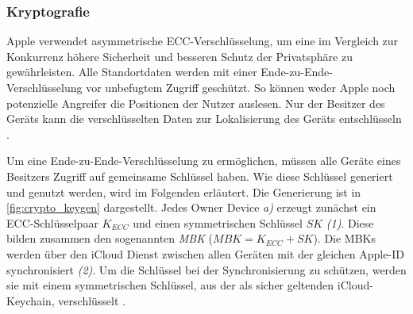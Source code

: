 \subsubsection{Kryptografie}
\label{sec:Kryptografie}
Apple verwendet asymmetrische \ac{ECC}-Verschlüsselung, um eine im Vergleich zur Konkurrenz höhere Sicherheit und besseren Schutz der Privatsphäre zu gewährleisten.
Alle Standortdaten werden mit einer Ende-zu-Ende-Verschlüsselung vor unbefugtem Zugriff geschützt.
So können weder Apple noch potenzielle Angreifer die Positionen der Nutzer auslesen.
Nur der Besitzer des Geräts kann die verschlüsselten Daten zur Lokalisierung des Geräts entschlüsseln \cite{Greenberg_FindMyCrypto}.

Um eine Ende-zu-Ende-Verschlüsselung zu ermöglichen, müssen alle Geräte eines Besitzers Zugriff auf gemeinsame Schlüssel haben.
Wie diese Schlüssel generiert und genutzt werden, wird im Folgenden erläutert.
Die Generierung ist in \autoref{fig:crypto_keygen} dargestellt.
Jedes Owner Device \textit{a)} erzeugt zunächst ein \ac{ECC}-Schlüsselpaar $K_{ECC}$ und einen symmetrischen Schlüssel $SK$ \textit{(1)}.
Diese bilden zusammen den sogenannten \textit{\ac{MBK}} ($MBK = K_{ECC} + SK$).
Die \acp{MBK} werden über den iCloud Dienst zwischen allen Geräten mit der gleichen Apple-ID synchronisiert \textit{(2)}.
Um die Schlüssel bei der Synchronisierung zu schützen, werden sie mit einem symmetrischen Schlüssel, aus der als sicher geltenden iCloud-Keychain, verschlüsselt \cite{Heinrich_FindMy,Afonin_iCloudKeychain}.
   
